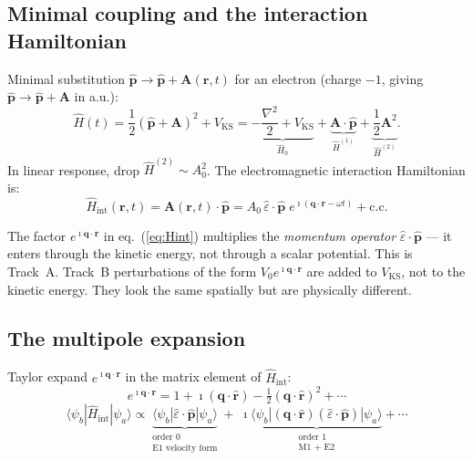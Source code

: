 \documentclass[11pt]{article}
\newcommand{\iunit}{\imath}
\newcommand{\Avec}{\mathbf{A}}
\newcommand{\phat}{\hat{\mathbf{p}}}
\newcommand{\rhat}{\hat{\mathbf{r}}}
\newcommand{\VKS}{V_{\mathrm{KS}}}
\begin{document}
\subsection{Minimal coupling and the interaction Hamiltonian}

Minimal substitution $\phat\to\phat+\Avec(\mathbf{r},t)$ for an
electron (charge $-1$, giving $\phat\to\phat+\Avec$ in a.u.):
\begin{equation}
  \hat{H}(t)
  = \frac{1}{2}(\phat+\Avec)^2 + \VKS
  = \underbrace{-\frac{\nabla^2}{2}+\VKS}_{\hat{H}_0}
  + \underbrace{\Avec\cdot\phat}_{\hat{H}^{(1)}}
  + \underbrace{\frac{1}{2}\Avec^2}_{\hat{H}^{(2)}}.
  \label{eq:H-expand}
\end{equation}
In linear response, drop $\hat{H}^{(2)}\sim A_0^2$.
The electromagnetic interaction Hamiltonian is:
\begin{equation}
  \hat{H}_\mathrm{int}(\mathbf{r},t)
  = \Avec(\mathbf{r},t)\cdot\phat
  = A_0\,\hat{\varepsilon}\cdot\phat\;
    e^{\iunit(\mathbf{q}\cdot\mathbf{r}-\omega t)}
    + \text{c.c.}
  \label{eq:Hint}
\end{equation}

\begin{warning}
The factor $e^{\iunit\mathbf{q}\cdot\mathbf{r}}$ in
eq.~(\ref{eq:Hint}) multiplies the \emph{momentum operator}
$\hat{\varepsilon}\cdot\phat$ --- it enters through the kinetic
energy, not through a scalar potential.
This is Track~A.
Track~B perturbations of the form $V_0 e^{\iunit\mathbf{q}\cdot\mathbf{r}}$
are added to $\VKS$, not to the kinetic energy.
They look the same spatially but are physically different.
\end{warning}

\subsection{The multipole expansion}

Taylor expand $e^{\iunit\mathbf{q}\cdot\mathbf{r}}$ in the matrix
element of $\hat{H}_\mathrm{int}$:
\begin{equation}
  e^{\iunit\mathbf{q}\cdot\mathbf{r}}
  = 1
  + \iunit(\mathbf{q}\cdot\rhat)
  - \tfrac{1}{2}(\mathbf{q}\cdot\rhat)^2
  + \cdots
  \label{eq:Taylor}
\end{equation}
\begin{equation}
  \langle\psi_b|\hat{H}_\mathrm{int}|\psi_a\rangle
  \propto
  \underbrace{
    \langle\psi_b|\hat{\varepsilon}\cdot\phat|\psi_a\rangle
  }_{\substack{\text{order 0}\\[2pt]\text{E1 velocity form}}}
  +\;\iunit
  \underbrace{
    \langle\psi_b|(\mathbf{q}\cdot\rhat)(\hat{\varepsilon}\cdot\phat)
    |\psi_a\rangle
  }_{\substack{\text{order 1}\\[2pt]\text{M1 + E2}}}
  + \cdots
  \label{eq:ME-expand}
\end{equation}
\end{document}
